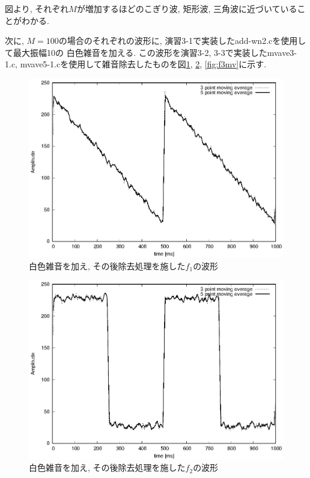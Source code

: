 \documentclass[titlepage]{jsarticle}
\begin{document}
    図より, それぞれ$M$が増加するほどのこぎり波, 矩形波, 三角波に近づいていることがわかる.

    次に, $M = 100$の場合のそれぞれの波形に, 演習3-1で実装したadd-wn2.cを使用して最大振幅10の
    白色雑音を加える. この波形を演習3-2, 3-3で実装したmvave3-1.c,
    mvave5-1.cを使用して雑音除去したものを図\ref{fig:f1mv}, \ref{fig:f2mv}, \ref{fig:f3mv}に示す.

    \begin{figure}[h]
        \centering
        \includegraphics[width=0.8\hsize]{images/f1mv.eps}
        \caption{白色雑音を加え, その後除去処理を施した$f_1$の波形}
        \label{fig:f1mv}
    \end{figure}

    \begin{figure}[h]
        \centering
        \includegraphics[width=0.8\hsize]{images/f2mv.eps}
        \caption{白色雑音を加え, その後除去処理を施した$f_2$の波形}
        \label{fig:f2mv}
    \end{figure}
\end{document}
